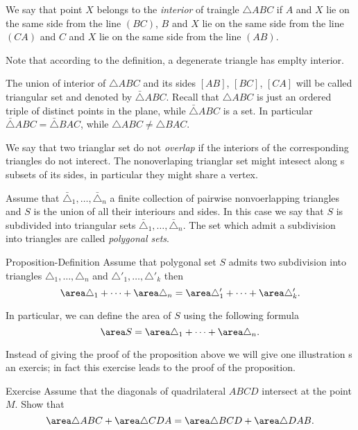 We say that point $X$ belongs to the \emph{interior} of traingle $\triangle ABC$
if $A$ and $X$ lie on the same side from the line $(BC)$,
$B$ and $X$ lie on the same side from the line $(CA)$
and 
$C$ and $X$ lie on the same side from the line $(AB)$.

Note that according to the definition,
a degenerate triangle has emplty interior.

The union of interior of $\triangle ABC$ and its sides $[AB]$, $[BC]$, $[CA]$
will be called triangular set and denoted by $\bar\triangle ABC$.
Recall that $\triangle ABC$ is just an ordered triple of distinct points in the plane,
while $\bar\triangle ABC$ is a set.
In particular $\bar\triangle ABC=\bar\triangle BAC$, while $\triangle ABC\ne\triangle BAC$.

We say that two trianglar set do not \emph{overlap} if the interiors of the corresponding triangles do not interect.
The nonoverlaping trianglar set might intesect along s subsets of its sides, in particular they might share a vertex.

Assume that  $\bar\triangle_1,\dots,\bar\triangle_n$ a finite collection of pairwise nonvoerlapping triangles
and $S$ is the union of all their interiours and sides.
In this case we say that $S$ is subdivided into triangular sets $\bar\triangle_1,\dots,\bar\triangle_n$.
The set which admit a subdivision into triangles are called \emph{polygonal sets}.

\begin{thm}{Proposition-Definition}
Assume that polygonal set $S$ admits two subdivision into triangles
$\triangle_1,\dots,\triangle_n$
and $\triangle'_1,\dots,\triangle'_k$
then
\[\area\triangle_1+\dots+\area\triangle_n
=\area\triangle'_1+\dots+\area\triangle'_k.\]

In particular, we can define the area of $S$ using the following formula
\[\area S=\area\triangle_1+\dots+\area\triangle_n.\]

\end{thm}

Instead of giving the proof of the proposition above we will give one illustration s an exercis;
in fact this exercise leads to the proof of the proposition.

\begin{thm}{Exercise}
Assume that the diagonals of quadrilateral $ABCD$ intersect at the point $M$.
Show that
\[\area\triangle ABC+\area\triangle CDA=\area\triangle BCD+\area\triangle DAB.\]
\end{thm}

